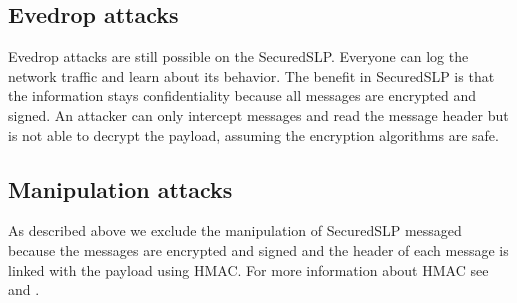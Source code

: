 \subsection{Evedrop attacks}
Evedrop attacks are still possible on the SecuredSLP. Everyone can log the network traffic and learn about its behavior. The benefit in SecuredSLP is that the information stays confidentiality because all messages are encrypted and signed. An attacker can only intercept messages and read the message header but is not able to decrypt the payload, assuming the encryption algorithms are safe.

\subsection{Manipulation attacks}
As described above we exclude the manipulation of SecuredSLP messaged because the messages are encrypted and signed and the header of each message is linked with the payload using HMAC. For more information about HMAC see \citep{Kraw97} and \citep{Kero00}.